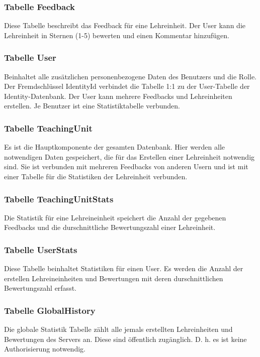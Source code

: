 \subsubsection{Tabelle Feedback}
Diese Tabelle beschreibt das Feedback für eine Lehreinheit. Der User kann die Lehreinheit in Sternen (1-5) bewerten und einen Kommentar hinzufügen. 

\subsubsection{Tabelle User}
Beinhaltet alle zusätzlichen personenbezogene Daten des Benutzers und die Rolle. Der Fremdschlüssel IdentityId verbindet die Tabelle 1:1 zu der User-Tabelle 
der Identity-Datenbank. Der User kann mehrere Feedbacks und Lehreinheiten erstellen. Je Benutzer ist eine Statistiktabelle verbunden.

\subsubsection{Tabelle TeachingUnit}
Es ist die Hauptkomponente der gesamten Datenbank. Hier werden alle notwendigen Daten gespeichert, die für das Erstellen einer Lehreinheit notwendig sind. 
Sie ist verbunden mit mehreren Feedbacks von anderen Usern und ist mit einer Tabelle für die Statistiken der Lehreinheit verbunden.

\subsubsection{Tabelle TeachingUnitStats}
Die Statistik für eine Lehreineinheit speichert die Anzahl der gegebenen Feedbacks und die durschnittliche Bewertungszahl einer Lehreinheit.

\subsubsection{Tabelle UserStats}
Diese Tabelle beinhaltet Statistiken für einen User. Es werden die Anzahl der erstellen Lehreineinheiten und Bewertungen mit deren durschnittlichen Bewertungszahl erfasst.

\subsubsection{Tabelle GlobalHistory}
Die globale Statistik Tabelle zählt alle jemals erstellten Lehreinheiten und Bewertungen des Servers an. Diese sind öffentlich zugänglich. 
D. h. es ist keine Authorisierung notwendig.

